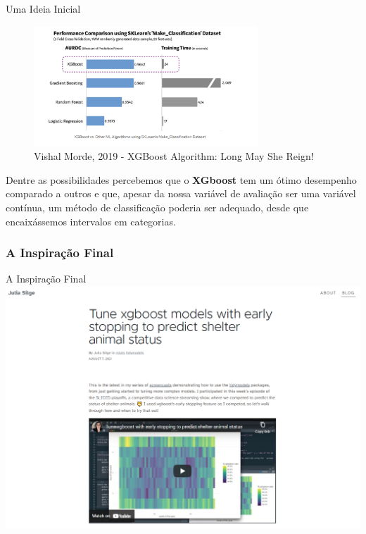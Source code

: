 \documentclass[
  9 pt,
  ignorenonframetext,
]{beamer}
\begin{document}
\begin{frame}{Uma Ideia Inicial}
\begin{figure}
\centering
\includegraphics[width=0.75\textwidth,height=\textheight]{./Imagens/desempenho_xgboost_comparacao.png}
\caption{Vishal Morde, 2019 - XGBoost Algorithm: Long May She Reign!}
\end{figure}

Dentre as possibilidades percebemos que o \textbf{XGboost} tem um ótimo
desempenho comparado a outros e que, apesar da nossa variável de
avaliação ser uma variável contínua, um método de classificação poderia
ser adequado, desde que encaixássemos intervalos em categorias.
\end{frame}

\hypertarget{a-inspirauxe7uxe3o-final}{%
\subsubsection{A Inspiração Final}\label{a-inspirauxe7uxe3o-final}}

\begin{frame}{A Inspiração Final}
\includegraphics[width=\textwidth,height=0.9\textheight]{./Imagens/xgboost_juliasilge.png}
\end{frame}
\end{document}
